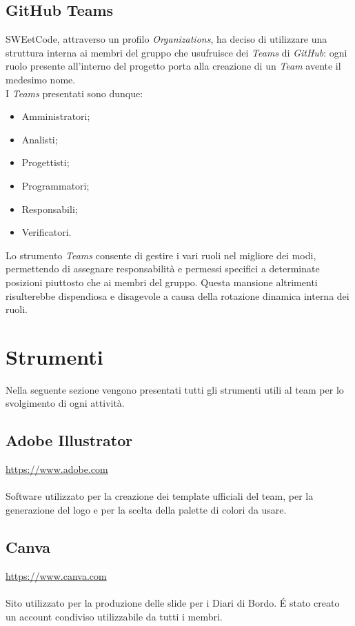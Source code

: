 \documentclass[10pt, a4paper]{article}
\begin{document}
\subsection{GitHub Teams}
SWEetCode, attraverso un profilo \textit{Organizations}, ha deciso di utilizzare una struttura interna ai membri del gruppo che usufruisce dei \textit{Teams} di \textit{GitHub}: ogni ruolo presente all'interno del progetto porta alla creazione di un \textit{Team} avente il medesimo nome.\\
I \textit{Teams} presentati sono dunque:
\begin{itemize}
    \item Amministratori;
    \item Analisti;
    \item Progettisti;
    \item Programmatori;
    \item Responsabili;
    \item Verificatori.
\end{itemize}
Lo strumento \textit{Teams} consente di gestire i vari ruoli nel migliore dei modi, permettendo di assegnare responsabilità e permessi specifici a determinate posizioni piuttosto che ai membri del gruppo. Questa mansione altrimenti risulterebbe dispendiosa e disagevole a causa della rotazione dinamica interna dei ruoli. 


\newpage
\section{Strumenti}
Nella seguente sezione vengono presentati tutti gli strumenti utili al team per lo svolgimento di ogni attività.

\subsection{Adobe Illustrator}
\href{https://www.adobe.com}{https://www.adobe.com}\\\\
Software utilizzato per la creazione dei template ufficiali del team, per la generazione del logo e per la scelta della palette di colori da usare. 

\subsection{Canva}
\href{https://www.canva.com}{https://www.canva.com}\\\\
Sito utilizzato per la produzione delle slide per i Diari di Bordo. É stato creato un account condiviso utilizzabile da tutti i membri.
\end{document}
